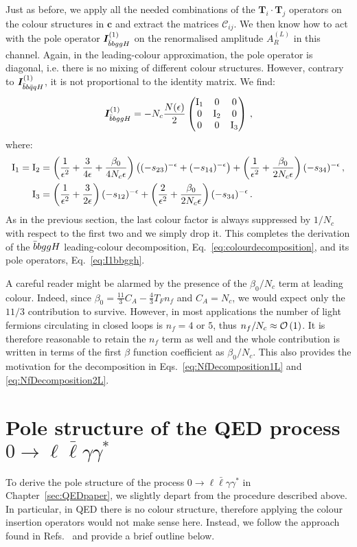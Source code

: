 \documentclass[main.tex]{subfiles}
\begin{document}
Just as before, we apply all the needed combinations of the $\bm{T}_i \cdot \bm{T}_j$ operators on the colour structures in $\bm{c}$ and extract the matrices $\mathcal{C}_{ij}$. We then know how to act with the pole operator $\bm{I}_{\bar{b}bggH}^{(1)}$ on the renormalised amplitude $A_R^{(L)}$ in this channel. Again, in the leading-colour approximation, the pole operator is diagonal, i.e. there is no mixing of different colour structures. However, contrary to $\bm{I}_{\bar{b}b\bar{q}qH}^{(1)}$, it is not proportional to the identity matrix. We find:
\begin{equation*}
    \bm{I}_{\bar{b}bggH}^{(1)} = -N_c \frac{N(\epsilon)}{2}
    \begin{pmatrix}
        \mathrm{I}_1 & 0 & 0\\
        0 & \mathrm{I}_2 & 0\\
        0 & 0 & \mathrm{I}_3
    \end{pmatrix}\,,
\end{equation*}
where:
\begin{align}
    \mathrm{I}_1 = \mathrm{I}_2 &= \left(\frac{1}{\epsilon^2} + \frac{3}{4\epsilon} + \frac{\beta_0}{4 N_c \epsilon}\right) \left((-s_{23})^{-\epsilon} + (-s_{14})^{-\epsilon}\right) +\left(\frac{1}{\epsilon^2} + \frac{\beta_0}{2 N_c\epsilon} \right) (-s_{34})^{-\epsilon}\,, \nonumber \\
    \mathrm{I}_3 &= \left(\frac{1}{\epsilon^2} + \frac{3}{2\epsilon} \right) (-s_{12})^{-\epsilon} + \left(\frac{2}{\epsilon^2} + \frac{\beta_0}{2 N_c \epsilon} \right) (-s_{34})^{-\epsilon}\,.
\end{align}
As in the previous section, the last colour factor is always suppressed by $1/N_c$ with respect to the first two and we simply drop it. This completes the derivation of the $\bar{b}bggH$ leading-colour decomposition, Eq.~\ref{eq:colourdecomposition}, and its pole operators, Eq.~\ref{eq:I1bbggh}.

A careful reader might be alarmed by the presence of the $\beta_0/N_c$ term at leading colour. Indeed, since $\beta_0 = \frac{11}{3}C_A - \frac{4}{3} T_F n_f$ and $C_A = N_c$, we would expect only the $11/3$ contribution to survive. However, in most applications the number of light fermions circulating in closed loops is $n_f=4$ or $5$, thus $n_f/N_c \approx  \mathcal{O}\left(1\right)$. It is therefore reasonable to retain the $n_f$ term as well and the whole contribution is written in terms of the first $\beta$ function coefficient as $\beta_0/N_c$. This also provides the motivation for the decomposition in Eqs.~\ref{eq:NfDecomposition1L} and \ref{eq:NfDecomposition2L}.
\section{Pole structure of the QED process $0\to \ell \bar\ell \gamma \gamma^*$} \label{app:QEDpolestructure}
To derive the pole structure of the process $0\to \ell \bar\ell \gamma \gamma^*$ in Chapter~\ref{sec:QEDpaper}, we slightly depart from the procedure described above. In particular, in QED there is no colour structure, therefore applying the colour insertion operators would not make sense here. Instead, we follow the approach found in Refs.~\cite{Gardi:2009qi, Gardi:2009zv, Becher:2009cu, Becher:2009qa} and provide a brief outline below.
\end{document}
